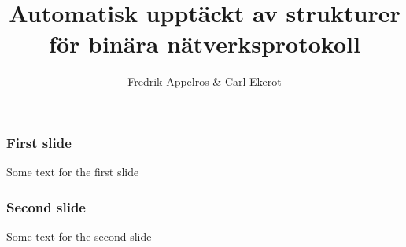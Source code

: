 \documentclass[xetex]{beamer}
\title{Automatisk upptäckt av strukturer för binära nätverksprotokoll}
\author{Fredrik Appelros \& Carl Ekerot}
\date
\begin{document}
    \frame{\titlepage}

    \begin{frame}
        \frametitle{First slide}
        Some text for the first slide
    \end{frame}
    \begin{frame}
        \frametitle{Second slide}
        Some text for the second slide
    \end{frame}
\end{document}
